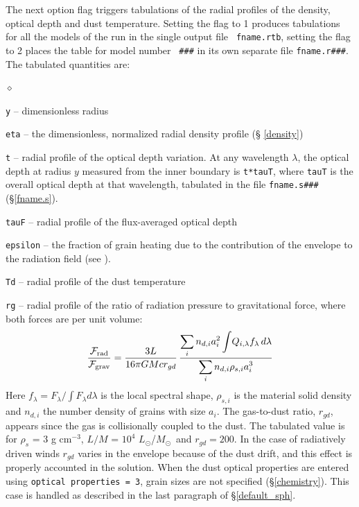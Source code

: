 \documentclass[11pt]{article}
\def\E#1{\hbox{$10^{#1}$}}
\def\eq#1{\begin{equation} #1 \end{equation}}
\def\Mo     {\hbox{$M_{\odot}$}}
\def\Lo     {\hbox{$L_{\odot}$}}
\def\DS     {\displaystyle}
\def\sub#1{_{\rm #1}}
\def\Frad {\hbox{${\cal F}\sub{rad}$}}
\def\Fgrav{\hbox{${\cal F}\sub{grav}$}}
\begin{document}
The next option flag triggers tabulations of the radial profiles of the
density, optical depth and dust temperature. Setting the flag to 1 produces
tabulations for all the models of the run in the single output file {\tt
fname.rtb}, setting the flag to 2 places the table for model number {\tt
\#\#\#} in its own separate file {\tt fname.r\#\#\#}. The tabulated quantities
are:

\begin{list}{$\diamond$}{}
\item{\tt y} -- dimensionless radius
\item{\tt eta} -- the dimensionless, normalized radial density profile (\S
\ref{density})
\item
{\tt t} -- radial profile of the optical depth variation.  At any wavelength
$\lambda$, the optical depth at radius $y$ measured from the inner boundary is
{\tt t*tauT}, where {\tt tauT} is the overall optical depth at that wavelength,
tabulated in the file {\tt fname.s\#\#\#} (\S \ref{fname.s}).

\item{\tt tauF} -- radial profile of the flux-averaged optical depth
\item
{\tt epsilon} -- the fraction of grain heating due to the contribution of the
envelope to the radiation field (see \cite{IE97}).
\item{\tt Td} -- radial profile of the dust temperature
\item{\tt rg} -- radial profile of the ratio of radiation pressure
to gravitational force, where both forces are per unit volume:
\eq{
    {\Frad\over\Fgrav} = {3L\over16\pi GMc r_{gd}}\,
    {\DS \sum_i n_{d,i} a_i^2\int\!Q_{i,\lambda} f_\lambda\,d\lambda \over
     \DS \sum_i n_{d,i}\rho_{s,i}a_i^3}
}
Here $f_\lambda = F_\lambda/\int F_\lambda d\lambda$ is the local spectral
shape, $\rho_{s,i}$ is the material solid density and $n_{d,i}$ the number
density of grains with size $a_i$.  The gas-to-dust ratio, $r_{gd}$, appears
since the gas is collisionally coupled to the dust. The tabulated value is for
$\rho_s$ = 3 g cm$^{-3}$, $L/M$ = \E4 \Lo/\Mo\ and $r_{gd} = 200$. In the case
of radiatively driven winds $r_{gd}$ varies in the envelope because of the dust
drift, and this effect is properly accounted in the solution. When the dust
optical properties are entered using {\tt optical properties = 3}, grain sizes
are not specified (\S \ref{chemistry}). This case is handled as described in
the last paragraph of \S\ref{default_sph}.

\end{list}
\end{document}
